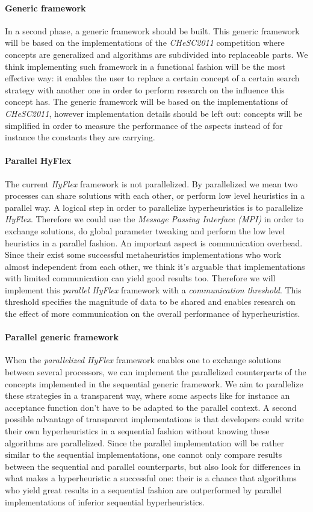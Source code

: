 \documentclass{IEEEconf}
\begin{document}
\paragraph{Generic framework}
In a second phase, a generic framework should be built. This generic framework will be based on the implementations of the \emph{CHeSC2011} competition where concepts are generalized and algorithms are subdivided into replaceable parts. We think implementing such framework in a functional fashion will be the most effective way: it enables the user to replace a certain concept of a certain search strategy with another one in order to perform research on the influence this concept has. The generic framework will be based on the implementations of \emph{CHeSC2011}, however implementation details should be left out: concepts will be simplified in order to measure the performance of the aspects instead of for instance the constants they are carrying.
\paragraph{Parallel HyFlex}
The current \emph{HyFlex} framework is not parallelized. By parallelized we mean two processes can share solutions with each other, or perform low level heuristics in a parallel way. A logical step in order to parallelize hyperheuristics is to parallelize \emph{HyFlex}. Therefore we could use the \emph{Message Passing Interface (MPI)} in order to exchange solutions, do global parameter tweaking and perform the low level heuristics in a parallel fashion. An important aspect is communication overhead. Since their exist some successful metaheuristics implementations who work almost independent from each other, we think it's arguable that implementations with limited communication can yield good results too. Therefore we will implement this \emph{parallel HyFlex} framework with a \emph{communication threshold}. This threshold specifies the magnitude of data to be shared and enables research on the effect of more communication on the overall performance of hyperheuristics.
\paragraph{Parallel generic framework}
When the \emph{parallelized HyFlex} framework enables one to exchange solutions between several processors, we can implement the parallelized counterparts of the concepts implemented in the sequential generic framework. We aim to parallelize these strategies in a transparent way, where some aspects like for instance an acceptance function don't have to be adapted to the parallel context. A second possible advantage of transparent implementations is that developers could write their own hyperheuristics in a sequential fashion without knowing these algorithms are parallelized. Since the parallel implementation will be rather similar to the sequential implementations, one cannot only compare results between the sequential and parallel counterparts, but also look for differences in what makes a hyperheuristic a successful one: their is a chance that algorithms who yield great results in a sequential fashion are outperformed by parallel implementations of inferior sequential hyperheuristics.
\end{document}
